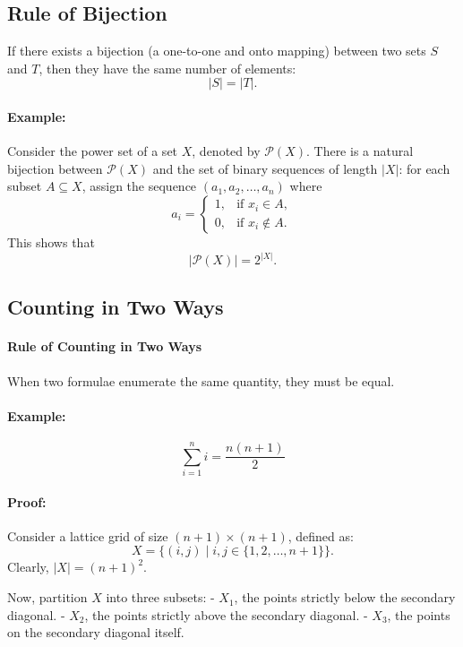 \documentclass{article}
\begin{document}
\subsection{Rule of Bijection}
If there exists a bijection (a one-to-one and onto mapping) between two sets $S$ and $T$, then they have the same number of elements:
\[
|S| = |T|.
\]

\paragraph{Example:}  
Consider the power set of a set $X$, denoted by $\mathcal{P}(X)$. There is a natural bijection between $\mathcal{P}(X)$ and the set of binary sequences of length $|X|$: for each subset $A \subseteq X$, assign the sequence $(a_1,a_2,\dots,a_n)$ where 
\[
a_i = \begin{cases} 
1, & \text{if } x_i \in A, \\
0, & \text{if } x_i \notin A.
\end{cases}
\]
This shows that 
\[
|\mathcal{P}(X)| = 2^{|X|}.
\]

\subsection{Counting in Two Ways}  

\paragraph{Rule of Counting in Two Ways}  
When two formulae enumerate the same quantity, they must be equal.  

\paragraph{Example:}  
\[
\sum_{i=1}^{n} i = \frac{n(n+1)}{2}
\]

\paragraph{Proof:}  
Consider a lattice grid of size \( (n+1) \times (n+1) \), defined as:  
\[
X = \{(i, j) \mid i, j \in \{1, 2, \dots, n+1\} \}.
\]  
Clearly, \( |X| = (n+1)^2 \).  

Now, partition \( X \) into three subsets:  
- \( X_1 \), the points strictly below the secondary diagonal.  
- \( X_2 \), the points strictly above the secondary diagonal.  
- \( X_3 \), the points on the secondary diagonal itself.  
\end{document}
